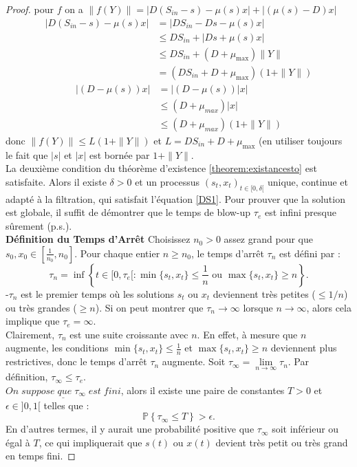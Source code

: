 \documentclass[12pt,a4paper]{report}%
\begin{document}
\begin{proof}
	pour $f$ on a $\|f(Y)\|=|D(S_{in}-s) - \mu(s)x|+|(\mu(s)-D) x|$
	\begin{align*}
		|D(S_{in}-s) - \mu(s)x| & = |D S_{in}-D s - \mu(s)x| \\
		& \leqslant D S_{in}+|D s + \mu(s)x| \\
		& \leqslant D S_{in}+(D+\mu_{\text{max}})\|Y\| \\
		& = (D S_{in}+D+\mu_{\text{max}})(1+\|Y\|)
	\end{align*}
	\begin{align*}
		|(D - \mu(s))x| & = |(D - \mu(s))|x| \\
		& \leqslant (D + \mu_{max})|x| \\
		& \leqslant (D + \mu_{max})(1+\|Y\|)
	\end{align*}
	donc 
	$\|f(Y)\|\leqslant L(1+\|Y\|)$ et $L=D S_{in}+D+\mu_{\text{max}}$ (en utiliser toujours le fait que \(|s| \)  et \(|x| \) est bornée par \( 1 + \|Y\| \).\\
	La deuxième condition du théorème d'existence \ref{theorem:existancesto} est satisfaite. Alors il existe $\delta>0 $ et un processus $(s_t, x_t)_{t \in [0,\delta[}$ unique, continue et adapté à la filtration, qui satisfait l'équation \eqref{DS1}. Pour prouver que la solution est globale, il suffit de démontrer que le temps de blow-up \(\tau_e\) est infini presque sûrement (p.s.).\\
	{\bf Définition du Temps d'Arrêt}
	Choisissez $n_0 > 0$ assez grand pour que $s_0, x_0 \in [\frac{1}{n_0}, n_0] $. Pour chaque entier \(n \geq n_0\), le temps d'arrêt \(\tau_n\) est défini par :
	\[
	\tau_n = \inf \left\{ t \in [0, \tau_e[ : \min \{s_t, x_t\} \leq \frac{1}{n} \text{ ou } \max \{s_t, x_t\} \geq n \right\}.
	\]
	-\(\tau_n\) est le premier temps où les solutions \(s_t\) ou \(x_t\) deviennent très petites (\(\leq 1/n\)) ou très grandes (\(\geq n\)). Si on peut montrer que \(\tau_n \to \infty\) lorsque \(n \to \infty\), alors cela implique que \(\tau_e = \infty\).\\
	Clairement, \(\tau_n\) est une suite croissante avec \(n\).  En effet, à mesure que \(n\) augmente, les conditions \(\min \{s_t, x_t\} \leq \frac{1}{n}\) et \(\max \{s_t, x_t\} \geq n\) deviennent plus restrictives, donc le temps d'arrêt \(\tau_n\) augmente.
	Soit \(\tau_\infty = \lim\limits_{n \to \infty} \tau_n\). Par définition, \(\tau_\infty \leq \tau_e\).\\
	$\underline{On\; suppose\; que\; \tau_\infty \; est \;fini}$, alors il existe une paire de constantes \(T > 0\) et \(\epsilon \in ]0, 1[\) telles que :
	\[
	\mathbb{P}\left\{\tau_\infty \leq T\right\} > \epsilon.
	\]
	En d'autres termes, il y aurait une probabilité positive que \(\tau_\infty\) soit inférieur ou égal à \(T\), ce qui impliquerait que \(s(t)\) ou \(x(t)\) devient très petit ou très grand en temps fini.
	

\end{proof}
\end{document}

